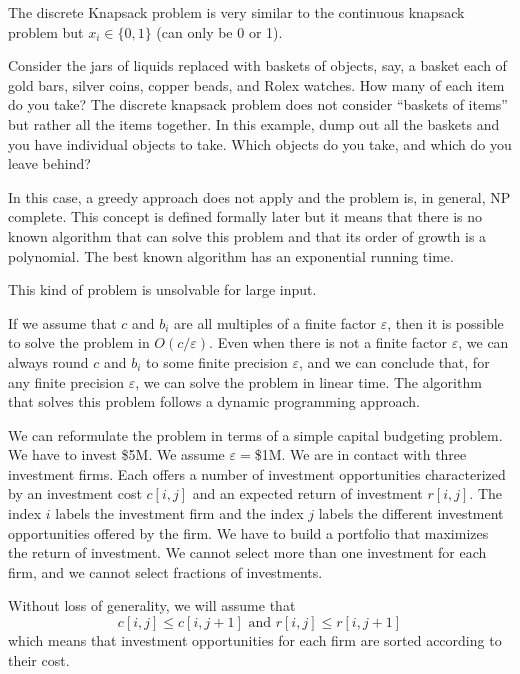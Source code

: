 \documentclass[justified, sixbynine]{tufte-book}
\theoremstyle{plain}%
\newtheorem * {corollary}{Corollary}
\theoremstyle{definition}
\theoremstyle{remark}
\newtheorem * {remark}{Remark}
\newtheorem * {note}{Note}
\begin{document}
\begin{fullwidth}
The discrete Knapsack problem is very similar to the continuous knapsack
problem but $x_i\in \{0, 1\}$ (can only be 0 or 1).

Consider the jars of liquids replaced with baskets of objects, say, a basket each of gold bars, silver coins, copper beads, and Rolex watches.  How many of each item do you take?  The discrete knapsack problem does not consider ``baskets of items'' but rather all the items together.  In this example, dump out all the baskets and you have individual objects to take.  Which objects do you take, and which do you leave behind?

In this case, a greedy approach does not apply and the problem is, in general,
NP complete. This concept is defined formally later but it means that there is no known algorithm that can solve this problem and that its order of growth is a polynomial. The best known algorithm has an exponential running time.

This kind of problem is unsolvable for large input.

If we assume that $c$ and $b_i$ are all multiples of a finite factor $\varepsilon$, then it is possible to solve the problem in $O(c/\varepsilon )$.
Even when there is not a finite factor $\varepsilon$,
we can always round $c$ and $b_i$ to some finite precision $\varepsilon$,
and we can conclude that, for any finite precision $\varepsilon$, we can
solve the problem in linear time. The algorithm that solves this problem
follows a dynamic programming approach.

We can reformulate the problem in terms of a simple capital budgeting
problem. We have to invest \$5M. We assume $\varepsilon =$\$1M. We are in
contact with three investment firms. Each offers a number of investment
opportunities characterized by an investment cost $c[i, j]$ and an expected
return of investment $r[i, j]$. The index $i$ labels the investment firm and
the index $j$ labels the different investment opportunities offered by the
firm. We have to build a portfolio that maximizes the return of investment.
We cannot select more than one investment for each firm, and we cannot select
fractions of investments.

Without loss of generality, we will assume that
\begin{equation}
c[i, j]\leq c[i, j+1]\text{ and }r[i, j]\leq r[i, j+1]
\end{equation}
which means that investment opportunities for each firm are sorted according
to their cost.


\end{fullwidth}
\end{document}
